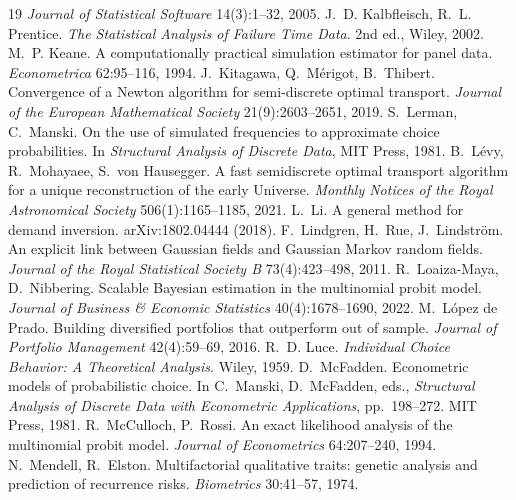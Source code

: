 \documentclass[11pt]{article}
\begin{document}
\begin{thebibliography}{19}
\emph{Journal of Statistical Software} 14(3):1--32, 2005.
J.~D. Kalbfleisch, R.~L. Prentice. \emph{The Statistical Analysis of
Failure Time Data}. 2nd ed., Wiley, 2002.
 M.~P. Keane.
A computationally practical simulation estimator for panel data.
\emph{Econometrica} 62:95--116, 1994.
 J.~Kitagawa, Q.~M\'erigot, B.~Thibert.
Convergence of a Newton algorithm for semi-discrete optimal transport.
\emph{Journal of the European Mathematical Society} 21(9):2603--2651,
2019.
 S.~Lerman, C.~Manski.
On the use of simulated frequencies to approximate choice probabilities.
In \emph{Structural Analysis of Discrete Data}, MIT Press, 1981.
 B.~L\'evy, R.~Mohayaee, S.~von Hausegger. A fast
semidiscrete optimal transport algorithm for a unique reconstruction of
the early Universe. \emph{Monthly Notices of the Royal Astronomical
Society} 506(1):1165--1185, 2021.
 L.~Li. A general method for demand
inversion. arXiv:1802.04444 (2018).
 F.~Lindgren, H.~Rue,
J.~Lindstr\"om. An explicit link between Gaussian fields and Gaussian Markov
random fields. \emph{Journal of the Royal Statistical Society B}
73(4):423--498, 2011.
 R.~Loaiza-Maya,
D.~Nibbering. Scalable Bayesian estimation in the multinomial probit
model. \emph{Journal of Business \& Economic Statistics}
40(4):1678--1690, 2022.
 M.~L\'opez de Prado.
Building diversified portfolios that outperform out of sample.
\emph{Journal of Portfolio Management} 42(4):59--69, 2016.
 R.~D. Luce. \emph{Individual Choice
Behavior: A Theoretical Analysis}. Wiley, 1959.
 D.~McFadden.
Econometric models of probabilistic choice. In C.~Manski, D.~McFadden,
eds., \emph{Structural Analysis of Discrete Data with Econometric
Applications}, pp.~198--272. MIT Press, 1981.
 R.~McCulloch, P.~Rossi.
An exact likelihood analysis of the multinomial probit model.
\emph{Journal of Econometrics} 64:207--240, 1994.
 N.~Mendell, R.~Elston.
Multifactorial qualitative traits: genetic analysis and prediction of
recurrence risks. \emph{Biometrics} 30:41--57, 1974.

\end{thebibliography}
\end{document}
